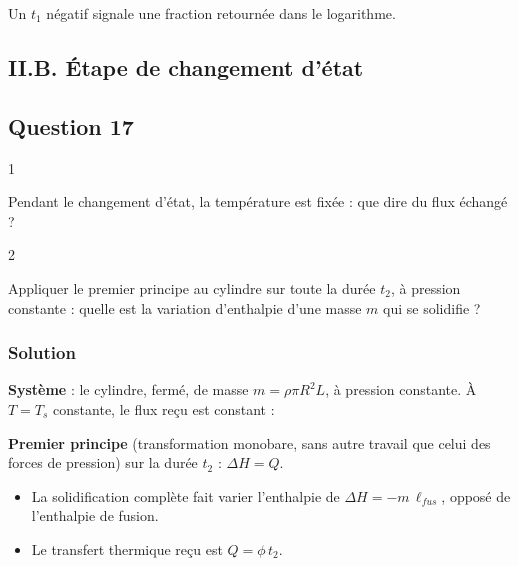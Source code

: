 \documentclass[11pt,a4paper]{article}
\providecommand{\tightlist}{\setlength{\itemsep}{0pt}\setlength{\parskip}{0pt}}
\newcommand{\equationajustee}[1]{%
  \sbox{\boiteequation}{$\displaystyle #1$}%
  \ifdim\wd\boiteequation>\linewidth
    \[\resizebox{\linewidth}{!}{\usebox{\boiteequation}}\]%
  \else
    \[#1\]%
  \fi}
\begin{document}
\equationajustee{\boxed{t_1 \approx 7{,}3\ \mathrm{s}}}

\begin{piege}

Un \(t_1\) négatif signale une fraction retournée dans le logarithme.

\end{piege}

\hypertarget{ii.b.-uxe9tape-de-changement-duxe9tat}{%
\subsection{II.B. Étape de changement d'état}\label{ii.b.-uxe9tape-de-changement-duxe9tat}}

\hypertarget{question-17}{%
\subsection{Question 17}\label{question-17}}

\begin{indication}{1}

Pendant le changement d'état, la température est fixée : que dire du flux échangé ?

\end{indication}

\begin{indication}{2}

Appliquer le premier principe au cylindre sur toute la durée \(t_2\), à pression constante : quelle est la variation d'enthalpie d'une masse \(m\) qui se solidifie ?

\end{indication}

\hypertarget{solution-16}{%
\subsubsection{Solution}\label{solution-16}}

\textbf{Système} : le cylindre, fermé, de masse \(m = \rho\pi R^2L\), à pression constante. À \(T = T_s\) constante, le flux reçu est constant :

\equationajustee{\phi = 2\pi RL\,h\,(T_a - T_s) < 0}

\textbf{Premier principe} (transformation monobare, sans autre travail que celui des forces de pression) sur la durée \(t_2\) : \(\Delta H = Q\).

\begin{itemize}
\tightlist
\item
  La solidification complète fait varier l'enthalpie de \(\Delta H = -m\,\ell_{fus}\), opposé de l'enthalpie de fusion.
\item
  Le transfert thermique reçu est \(Q = \phi\,t_2\).
\end{itemize}
\end{document}
